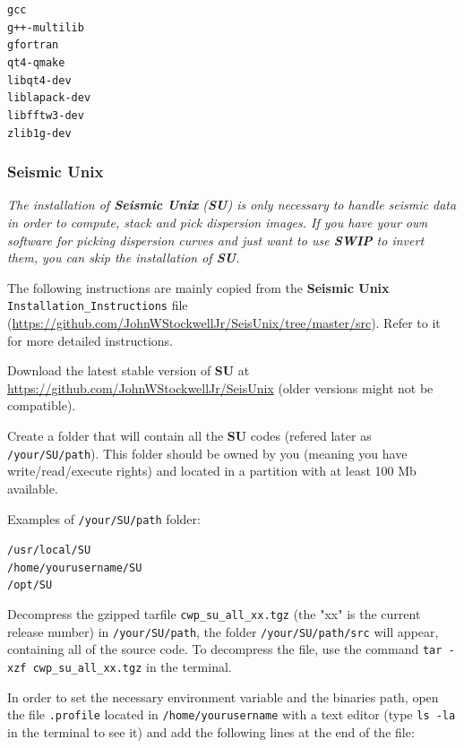 \documentclass[twoside,a4paper]{article}
\def\SWIP{\textbf{SWIP}}
\def\SU{\textbf{SU}}
\def\SeismicUnix{\textbf{Seismic Unix}}
\begin{document}
\verb|gcc|\\
\verb|g++-multilib|\\
\verb|gfortran|\\
\verb|qt4-qmake|\\
\verb|libqt4-dev|\\
\verb|liblapack-dev|\\
\verb|libfftw3-dev|\\
\verb|zlib1g-dev|

\subsubsection{Seismic Unix}
\textit{The installation of {\SeismicUnix} ({\SU}) is only necessary to handle seismic data in order to compute, stack and pick dispersion images. If you have your own software for picking dispersion curves and just want to use {\SWIP} to invert them, you can skip the installation of {\SU}.}

The following instructions are mainly copied from the {\SeismicUnix} \verb|Installation_Instructions| file (\url{https://github.com/JohnWStockwellJr/SeisUnix/tree/master/src}). Refer to it for more detailed instructions.

Download the latest stable version of {\SU} at \url{https://github.com/JohnWStockwellJr/SeisUnix} (older versions might not be compatible).

Create a folder that will contain all the {\SU} codes (refered later as \verb|/your/SU/path|). This folder should be owned by you (meaning you have write/read/execute rights) and located in a partition with at least 100 Mb available.

Examples of \verb|/your/SU/path| folder:

\verb|/usr/local/SU|\\
\verb|/home/yourusername/SU|\\
\verb|/opt/SU|

Decompress the gzipped tarfile \verb|cwp_su_all_xx.tgz| (the "xx" is the current release number) in \verb|/your/SU/path|, the folder \verb|/your/SU/path/src| will appear, containing all of the source code. To decompress the file, use the command \verb|tar -xzf cwp_su_all_xx.tgz| in the terminal.

In order to set the necessary environment variable and the binaries path, open the file \verb|.profile| located in \verb|/home/yourusername| with a text editor (type \verb|ls -la| in the terminal to see it) and add the following lines at the end of the file:
\end{document}
